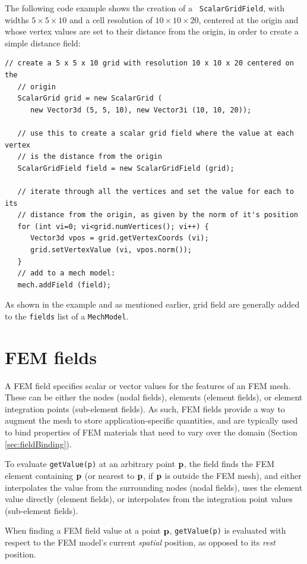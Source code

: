 The following code example shows the creation of a {\tt
ScalarGridField}, with widths $5 \times 5 \times 10$ and a cell
resolution of $10 \times 10 \times 20$, centered at the origin and
whose vertex values are set to their distance from the origin,
in order to create a simple distance field:
%
\begin{lstlisting}[]
   // create a 5 x 5 x 10 grid with resolution 10 x 10 x 20 centered on the
   // origin
   ScalarGrid grid = new ScalarGrid (
      new Vector3d (5, 5, 10), new Vector3i (10, 10, 20));

   // use this to create a scalar grid field where the value at each vertex
   // is the distance from the origin
   ScalarGridField field = new ScalarGridField (grid);

   // iterate through all the vertices and set the value for each to its
   // distance from the origin, as given by the norm of it's position
   for (int vi=0; vi<grid.numVertices(); vi++) {
      Vector3d vpos = grid.getVertexCoords (vi);
      grid.setVertexValue (vi, vpos.norm()); 
   }
   // add to a mech model:
   mech.addField (field);
\end{lstlisting}
%
As shown in the example and as mentioned earlier, grid field are
generally added to the {\tt fields} list of a {\tt MechModel}.

\section{FEM fields}
\label{sec:femFields}

A FEM field specifies scalar or vector values for the features of an
FEM mesh. These can be either the nodes (nodal fields), elements
(element fields), or element integration points (sub-element fields).
As such, FEM fields provide a way to augment the mesh to store
application-specific quantities, and are typically used to bind
properties of FEM materials that need to vary over the domain (Section
\ref{sec:fieldBinding}).

To evaluate {\tt getValue(p)} at an arbitrary point ${\bf p}$, the field
finds the FEM element containing ${\bf p}$ (or nearest to ${\bf p}$, if ${\bf p}$ is
outside the FEM mesh), and either interpolates the value from the
surrounding nodes (nodal fields), uses the element value directly
(element fields), or interpolates from the integration point values
(sub-element fields).

\begin{sideblock}
When finding a FEM field value at a point ${\bf p}$, 
{\tt getValue(p)} is evaluated with respect to the FEM model's current
{\it spatial} position, as opposed to its {\it rest} position.
\end{sideblock}

